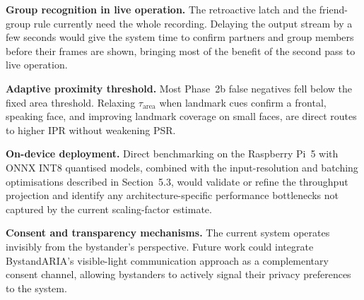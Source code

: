 \textbf{Group recognition in live operation.} The retroactive latch and the
friend-group rule currently need the whole recording. Delaying the output stream
by a few seconds would give the system time to confirm partners and group members
before their frames are shown, bringing most of the benefit of the second pass to
live operation.

\textbf{Adaptive proximity threshold.} Most Phase~2b false negatives fell below the
fixed area threshold. Relaxing $\tau_{\mathrm{area}}$ when landmark cues confirm a
frontal, speaking face, and improving landmark coverage on small faces, are
direct routes to higher IPR without weakening PSR.

\textbf{On-device deployment.} Direct benchmarking on the Raspberry Pi~5 with ONNX
INT8 quantised models, combined with the input-resolution and batching optimisations
described in Section~5.3, would validate or refine the throughput projection and
identify any architecture-specific performance bottlenecks not captured by the
current scaling-factor estimate.

\textbf{Consent and transparency mechanisms.} The current system operates
invisibly from the bystander's perspective. Future work could integrate BystandARIA's
visible-light communication approach \cite{ref:bystandaria} as a complementary
consent channel, allowing bystanders to actively signal their privacy preferences
to the system.

%
%
%
%
%
%
